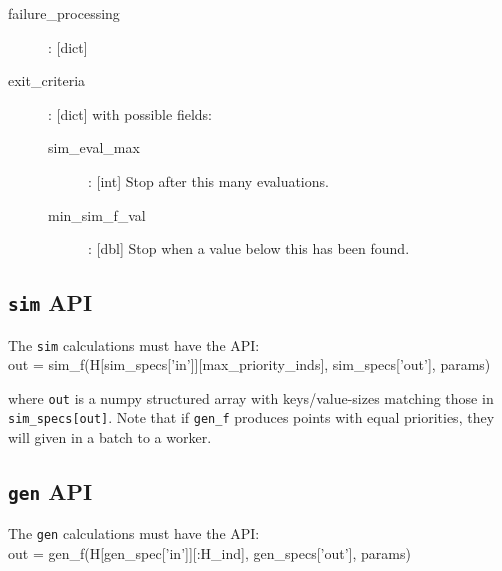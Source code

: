 \documentclass{article}
\newenvironment{allintypewriter}{\ttfamily}{\par}
\begin{document}
\begin{allintypewriter}
\begin{description}
    \item[failure\_processing]: [dict]

    \item[exit\_criteria]: [dict] with possible fields:
      \begin{description}
        \item[sim\_eval\_max]: [int] Stop after this many evaluations.
        \item[min\_sim\_f\_val]: [dbl] Stop when a value below this has been found.
      \end{description}


  \end{description}
\end{allintypewriter}
        

\subsection{\texttt{sim} API}
The \texttt{sim} calculations must have the API:\\

\begin{allintypewriter}
  out = sim\_f(H[sim\_specs['in']][max\_priority\_inds], sim\_specs['out'],
  params)\\
\end{allintypewriter}

where \texttt{out} is a numpy structured array with keys/value-sizes matching
those in \texttt{sim\_specs[out]}. Note that if \texttt{gen\_f} produces points
with equal priorities, they will given in a batch to a worker.

\subsection{\texttt{gen} API}
The \texttt{gen} calculations must have the API:\\

\begin{allintypewriter}
  out = gen\_f(H[gen\_spec['in']][:H\_ind], gen\_specs['out'], params)\\
\end{allintypewriter}
\end{document}
